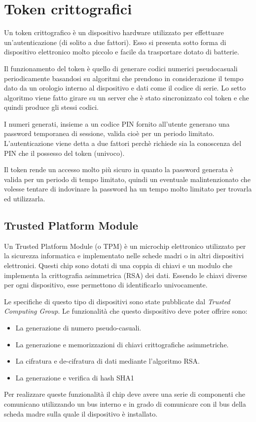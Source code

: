 \chapter{Token crittografici}
\label{chapter3}

Un token crittografico è un dispositivo hardware utilizzato per effettuare un'autenticazione (di solito a due fattori). Esso si presenta sotto forma di dispositivo elettronico molto piccolo e facile da trasportare dotato di batterie.

Il funzionamento del token è quello di generare codici numerici pseudocasuali periodicamente basandosi su algoritmi che prendono in considerazione il tempo dato da un orologio interno al dispositivo e dati come il codice di serie. Lo setto algoritmo viene fatto girare su un server che è stato sincronizzato col token e che quindi produce gli stessi codici.

I numeri generati, insieme a un codice PIN fornito all'utente generano una password temporanea di sessione, valida cioè per un periodo limitato. L'autenticazione viene detta a due fattori perchè richiede sia la conoscenza del PIN che il possesso del token (univoco).

Il token rende un accesso molto più sicuro in quanto la password generata è valida per un periodo di tempo limitato, quindi un eventuale malintenzionato che volesse tentare di indovinare la password ha un tempo molto limitato per trovarla ed utilizzarla.
\cite{wiki_token}

\section{Trusted Platform Module}
Un Trusted Platform Module (o TPM) è un microchip elettronico utilizzato per la sicurezza informatica e implementato nelle schede madri o in altri dispositivi elettronici. Questi chip sono dotati di una coppia di chiavi e un modulo che implementa la crittografia asimmetrica (RSA) dei dati. Essendo le chiavi diverse per ogni dispositivo, esse permettono di identificarlo univocamente.

Le specifiche di questo tipo di dispositivi sono state pubblicate dal \textit{Trusted Computing Group}. Le funzionalità che questo dispositivo deve poter offrire sono:
\begin{itemize}
    \item La generazione di numero pseudo-casuali.
    \item La generazione e memorizzazioni di chiavi crittografiche asimmetriche.
    \item La cifratura e de-cifratura di dati mediante l'algoritmo RSA.
    \item La generazione e verifica di hash SHA1
\end{itemize}
Per realizzare queste funzionalità il chip deve avere una serie di componenti che comunicano utilizzando un bus interno e in grado di comunicare con il bus della scheda madre sulla quale il dispositivo è installato.

